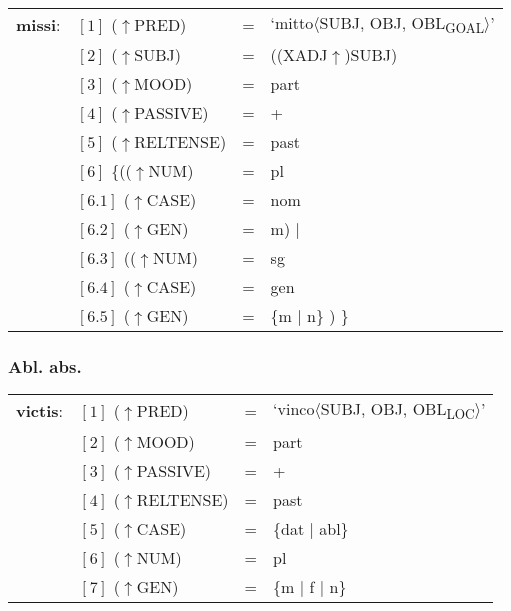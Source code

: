 \documentclass[12pt,a4paper]{article}
\begin{document}
\begin{singlespace}
\begin{tabular}{ l  l  l  l  } 
\textbf{missi}: & $[1]$ \:  ($\uparrow$PRED) & = & `mitto$\langle$SUBJ, OBJ, OBL\textsubscript{GOAL}$\rangle$'\\
$\qquad$ & $[2]$ \:  ($\uparrow$SUBJ) & = & ((XADJ$\uparrow$)SUBJ) \\
$\qquad$ & $[3]$ \:  ($\uparrow$MOOD) & = & part \\
$\qquad$ & $[4]$ \:  ($\uparrow$PASSIVE) & = & + \\
$\qquad$ & $[5]$ \: ($\uparrow$RELTENSE) & = & past \\
$\qquad$ & $[6]$ \:  \{(($\uparrow$NUM) & = & pl \\ 
$\qquad$ & $[6.1]$ \:  ($\uparrow$CASE) & = & nom \\
$\qquad$ & $[6.2]$ \:  ($\uparrow$GEN) & = & m) $\mid$\\
$\qquad$ & $[6.3]$ \:  (($\uparrow$NUM) & = & sg \\ 
$\qquad$ & $[6.4]$ \: ($\uparrow$CASE) & = & gen \\
$\qquad$ & $[6.5]$ \:  ($\uparrow$GEN) & = & \{m $\mid$ n\} ) \} \\
\end{tabular}
\end{singlespace}

\subsubsection{Abl. abs.}

\begin{singlespace}
\begin{tabular}{ l  l  l  l  } 
\textbf{victis}: & $[1]$ \:  ($\uparrow$PRED) & = & `vinco$\langle$SUBJ, OBJ, OBL\textsubscript{LOC}$\rangle$'\\
$\qquad$ & $[2]$ \:  ($\uparrow$MOOD) & = & part\\
$\qquad$ & $[3]$ \: ($\uparrow$PASSIVE) & = & + \\
$\qquad$ & $[4]$ \: ($\uparrow$RELTENSE) & = & past \\
$\qquad$ & $[5]$ \: ($\uparrow$CASE) & = & \{dat $\mid$ abl\} \\
$\qquad$ & $[6]$ \:  ($\uparrow$NUM) & = & pl \\
$\qquad$ & $[7]$ \: ($\uparrow$GEN) & = & \{m $\mid$ f $\mid$ n\} \\
\end{tabular}
\end{singlespace}
\end{document}
